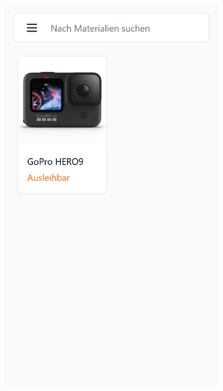 \begin{figure}[p]
    \centering
    \includegraphics[scale=0.19]{Bilder/Dialgobeispiel/Suche.png}

\end{figure}
